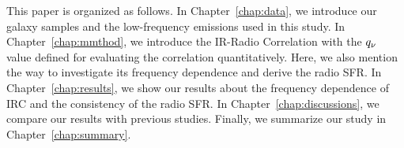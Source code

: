 %

This paper is organized as follows.
In Chapter~\ref{chap:data}, we introduce our galaxy samples and the low-frequency emissions used in this study.
In Chapter~\ref{chap:mmthod}, we introduce the IR-Radio Correlation with the $q_{\nu}$ value defined for evaluating the correlation quantitatively. Here, we also mention the way to investigate its frequency dependence and derive the radio SFR\@.
In Chapter~\ref{chap:results}, we show our results about the frequency dependence of IRC and the consistency of the radio SFR\@.
In Chapter~\ref{chap:discussions}, we compare our results with previous studies.
Finally, we summarize our study in Chapter~\ref{chap:summary}.



%
%




